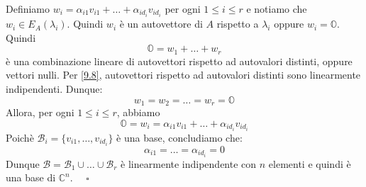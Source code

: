 \documentclass[a4paper]{article}
\theoremstyle{break}
\theoremstyle{break}
\theoremstyle{break}
\theoremstyle{break}
\begin{document}
\begin{itemize}
    \vspace{1em}
    \noindent Definiamo \( w_i = \alpha_{i1}v_{i1} + \ldots + \alpha_{id_i}v_{id_i} \) per
    ogni \( 1 \le i \le r \) e notiamo che \( w_i \in E_A(\lambda_i) \).
    Quindi \( w_i \) è un autovettore di \( A \) rispetto a \( \lambda_i \) oppure
    \( w_i = \mathbb{O} \). Quindi
    \[
    \mathbb{O} = w_1 + \ldots + w_r
    \] 
    è una combinazione lineare di autovettori rispetto ad autovalori distinti, oppure vettori
    nulli. Per \ref{9.8}, autovettori rispetto ad autovalori distinti sono linearmente
    indipendenti. Dunque:
    \[
    w_1 = w_2 = \ldots = w_r = \mathbb{O}
    \] 
    Allora, per ogni \( 1 \le i \le r \), abbiamo
    \[
    \mathbb{O} = w_i = \alpha_{i1}v_{i1} + \ldots + \alpha_{id_i}v_{id_i}
    \] 
    Poichè \( \mathcal{B}_i = \{v_{i1}, \ldots, v_{id_i}\}  \) è una base, concludiamo
    che:
    \[
    \alpha_{i1} = \ldots = \alpha_{id_i} = 0
    \] 
    Dunque \( \mathcal{B} = \mathcal{B}_1 \cup \ldots \cup \mathcal{B}_r \) è linearmente
    indipendente con \( n \) elementi e quindi è una base di \( \mathbb{C}^n \).
    \( \quad \square \) 
\end{itemize}
\end{document}
